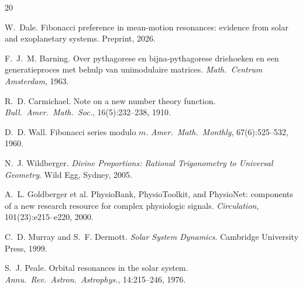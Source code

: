 \documentclass[11pt]{article}
\begin{document}
\begin{thebibliography}{20}

W.~Dale.
\newblock Fibonacci preference in mean-motion resonances: evidence from solar and exoplanetary systems.
\newblock Preprint, 2026.

F.~J.~M. Barning.
\newblock Over pythagorese en bijna-pythagorese driehoeken en een generatieproces met behulp van unimodulaire matrices.
\newblock \emph{Math.\ Centrum Amsterdam}, 1963.

R.~D. Carmichael.
\newblock Note on a new number theory function.
\newblock \emph{Bull.\ Amer.\ Math.\ Soc.}, 16(5):232--238, 1910.

D.~D. Wall.
\newblock Fibonacci series modulo $m$.
\newblock \emph{Amer.\ Math.\ Monthly}, 67(6):525--532, 1960.

N.~J. Wildberger.
\newblock \emph{Divine Proportions: Rational Trigonometry to Universal Geometry}.
\newblock Wild Egg, Sydney, 2005.

A.~L. Goldberger et al.
\newblock PhysioBank, PhysioToolkit, and PhysioNet: components of a new research resource for complex physiologic signals.
\newblock \emph{Circulation}, 101(23):e215--e220, 2000.

C.~D. Murray and S.~F. Dermott.
\newblock \emph{Solar System Dynamics}.
\newblock Cambridge University Press, 1999.

S.~J. Peale.
\newblock Orbital resonances in the solar system.
\newblock \emph{Annu.\ Rev.\ Astron.\ Astrophys.}, 14:215--246, 1976.

\end{thebibliography}
\end{document}
